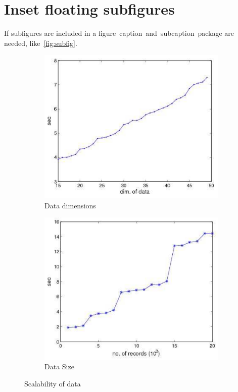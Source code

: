 \section{Inset floating subfigures}
If subfigures are included in a figure~caption~and~subcaption~package are needed, like~\ref{fig:subfig}.
\begin{figure}[htbp]
	\centering
	\begin{subfigure}[b]{0.45\textwidth}
		\centering
		\includegraphics[width=\textwidth]{figures/dataDimensions.pdf}
		\caption{Data dimensions}\label{fig:subfig:datadim}
	\end{subfigure}
	\begin{subfigure}[b]{0.45\textwidth}
		\centering
		\includegraphics[width=\textwidth]{figures/dataSize.pdf}
	\caption{Data Size}\label{fig:subfig:datasize}
	\end{subfigure}
	\caption{Scalability of data}
	\vspace{\baselineskip}
\end{figure}

